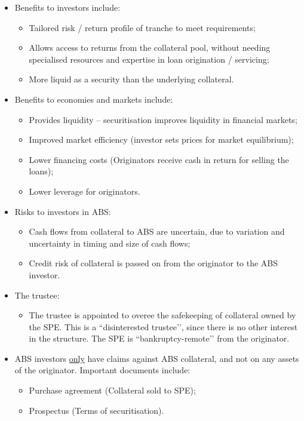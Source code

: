 \documentclass[../notes_compiled.tex]{subfiles}
\begin{document}
\begin{itemize}
\item Benefits to investors include:
\begin{itemize}
\item Tailored risk / return profile of tranche to meet requirements;
\item Allows access to returns from the collateral pool, without needing specialised resources and expertise in loan origination / servicing;
\item More liquid as a security than the underlying collateral.
\end{itemize}

\item Benefits to economies and markets include:
\begin{itemize}
\item Provides liquidity -- securitisation improves liquidity in financial markets;
\item Improved market efficiency (investor sets prices for market equilibrium);
\item Lower financing costs (Originators receive cash in return for selling the loans);
\item Lower leverage for originators.
\end{itemize}

\item Risks to investors in ABS:
\begin{itemize}
\item Cash flows from collateral to ABS are uncertain, due to variation and uncertainty in timing and size of cash flows;
\item Credit risk of collateral is passed on from the originator to the ABS investor.
\end{itemize}

\item The trustee:
\begin{itemize}
\item The trustee is appointed to overee the safekeeping of collateral owned by the SPE. This is a ``disinterested trustee’’, since there is no other interest in the structure. The SPE is ``bankruptcy-remote’’ from the originator.
\end{itemize}

\item ABS investors \underline{only} have claims against ABS collateral, and not on any assets of the originator. Important documents include:
\begin{itemize}
\item Purchase agreement (Collateral sold to SPE);
\item Prospectus (Terms of securitisation).
\end{itemize}


\end{itemize}
\end{document}
